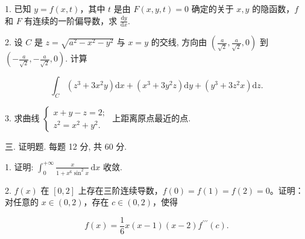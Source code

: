 \documentclass{examcollection}
\renewcommand{\displayformula}[1]{\[#1\]}
\begin{document}
{\begin{minipage}{\textwidth}
1. 已知 $y = f(x, t)$，其中 $t$ 是由 $F(x, y, t) = 0$ 确定的关于 $x, y$ 的隐函数，$f$ 和 $F$ 有连续的一阶偏导数，求 $\frac{\mathrm{d}y}{\mathrm{d}x}$.\par
2. 设 $C$ 是 $z = \sqrt{a^2 - x^2 - y^2}$ 与 $x = y$ 的交线, 方向由 $\left(\frac{a}{\sqrt{2}}, \frac{a}{\sqrt{2}}, 0\right)$ 到 $\left(-\frac{a}{\sqrt{2}}, -\frac{a}{\sqrt{2}}, 0\right)$. 计算\par
\displayformula{\int_ {C} \left(z ^ {3} + 3 x ^ {2} y\right) \mathrm{d} x + \left(x ^ {3} + 3 y ^ {2} z\right) \mathrm{d} y + \left(y ^ {3} + 3 z ^ {2} x\right) \mathrm{d} z.}\par
3. 求曲线  $\left\{\begin{aligned}x+y-z=2;\\ z^{2}=x^{2}+y^{2}.\end{aligned}\right.$  上距离原点最近的点.\par
三. 证明题. 每题 12 分, 共 60 分.\par
1. 证明: $\int_{0}^{+\infty} \frac{x}{1 + x^{6} \sin^{2} x} \, \mathrm{d}x$ 收敛.\par
2. $f(x)$ 在 $[0,2]$ 上存在三阶连续导数，$f(0) = f(1) = f(2) = 0$。证明：对任意的 $x \in (0,2)$，存在 $c \in (0,2)$，使得\par
\displayformula{f (x) = \frac {1}{6} x (x - 1) (x - 2) f ^ {\prime \prime \prime} (c).}\par
\end{minipage}}
\ifdim\dimexpr\ht\proofbox+\dp\proofbox\relax>\textheight
\noindent\resizebox{!}{\textheight}{\usebox{\proofbox}}\else\noindent\usebox{\proofbox}\fi\clearpage
\end{document}
